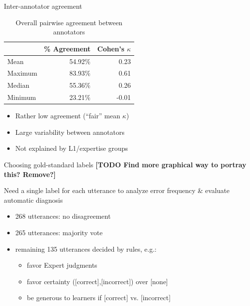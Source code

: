 \documentclass[xcolor={dvipsnames}]{beamer}
\newcommand{\TODO}[1]{{\color{red}\textbf{[TODO #1]}}}
\begin{document}
		\begin{frame}{Inter-annotator agreement}
		\begin{table}%
			\centering
			\caption{Overall pairwise agreement between annotators}
			\begin{tabular}{lrr}
			\toprule
				&	\% Agreement	&	Cohen's $\kappa$	\\
			\midrule
Mean		&	54.92\%	&	0.23	\\
Maximum	&	83.93\%	&	0.61	\\
Median		&	55.36\%	&	0.26	\\
Minimum	&	23.21\%	&	-0.01	\\
			\bottomrule
			\end{tabular}			
			\label{tab:agreement:overall}
		\end{table}
		
		\begin{itemize}
		\item{Rather low agreement (``fair'' mean $\kappa$)}
		\item{Large variability between annotators}
		\item{Not explained by L1/expertise groups}
		\end{itemize}
		\end{frame}	
		
		\begin{frame}{Choosing gold-standard labels}
		\TODO{Find more graphical way to portray this? Remove?}
		
		Need a single label for each utterance to analyze error frequency \& evaluate automatic diagnosis		
		\begin{itemize}
		\item 268 utterances: no disagreement 
		\item 265 utterances: majority vote
		\item remaining 135 utterances decided by rules, e.g.: 
			\begin{itemize}
			\item favor Expert judgments
			\item favor certainty ([correct],[incorrect]) over [none]
			\item be generous to learners if [correct] vs. [incorrect]
			\end{itemize}
		\end{itemize}
		\end{frame}
		
\end{document}
